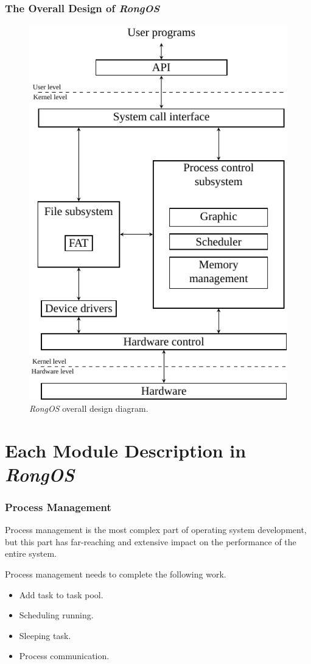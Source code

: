 \documentclass{beamer}
\begin{document}
\begin{frame}
\frametitle{The Overall Design of \emph{RongOS}}
\begin{figure}
\includegraphics[scale=0.5]{../thesis/figs/kernel-block.pdf}
\caption{\emph{RongOS} overall design diagram.}
\end{figure}
\end{frame}


\section{Each Module Description in \emph{RongOS}}
\begin{frame}
\frametitle{Process Management}
Process management is the most complex part of operating system development, but this part
has far-reaching and extensive impact on the performance of the entire system.

Process management needs to complete the following work.
\begin{itemize}
\item Add task to task pool.
\item Scheduling running.
\item Sleeping task.
\item Process communication.
\end{itemize}


\end{frame}
\end{document}
